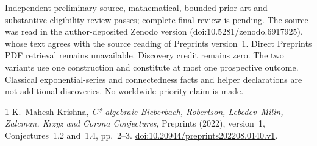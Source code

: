 \documentclass[11pt]{article}
\begin{document}
Independent preliminary source, mathematical, bounded prior-art and
substantive-eligibility review passes; complete final review is pending.
The source was read in the author-deposited Zenodo version
(doi:10.5281/zenodo.6917925), whose text agrees with the source reading of
Preprints version~1. Direct Preprints PDF retrieval remains unavailable.
Discovery credit remains zero. The two variants use one
construction and constitute at most one prospective outcome. Classical
exponential-series and connectedness facts and helper declarations are not
additional discoveries. No worldwide priority claim is made.

\begin{thebibliography}{1}
 K.~Mahesh Krishna,
\emph{C*-algebraic Bieberbach, Robertson, Lebedev--Milin, Zalcman, Krzyz and
Corona Conjectures}, Preprints (2022), version~1,
Conjectures~1.2 and~1.4, pp.~2--3.
\href{https://doi.org/10.20944/preprints202208.0140.v1}{doi:10.20944/preprints202208.0140.v1}.
\end{thebibliography}
\end{document}
